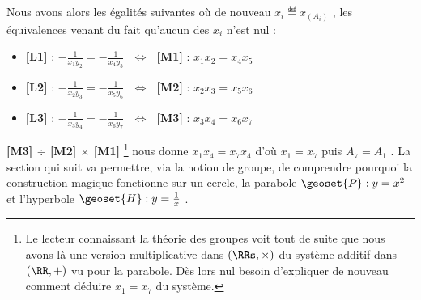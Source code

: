 \medskip

Nous avons alors les égalités suivantes où de nouveau $x_i \eqdef x_{(A_i)}$ , les équivalences venant du fait qu'aucun des $x_i$ n'est nul :
\begin{itemize}[label=\small\textbullet]
	\item \textbf{[L1]} : 
	      $- \frac{1}{x_1 y_2} = - \frac{1}{x_4 y_5}$
	      $\,\, \Longleftrightarrow \,\,$
	      \textbf{[M1]} : 
	      $x_1 x_{2} = x_{4} x_{5}$

	\item \textbf{[L2]} : 
	      $- \frac{1}{x_2 y_3} = - \frac{1}{x_5 y_6}$
	      $\,\, \Longleftrightarrow \,\,$
	      \textbf{[M2]} : 
	      $x_2 x_{3} = x_{5} x_{6}$

	\item \textbf{[L3]} : 
	      $- \frac{1}{x_3 y_4} = - \frac{1}{x_6 y_7}$
	      $\,\, \Longleftrightarrow \,\,$
	      \textbf{[M3]} : 
	      $x_3 x_{4} = x_{6} x_{7}$
\end{itemize}


\medskip

\textbf{[M3] $\div$ [M2] $\times$ [M1]}
\footnote{
	Le lecteur connaissant la théorie des groupes voit tout de suite que nous avons là une version multiplicative dans $(\RRs , \times)$ du système additif dans $(\RR , +)$ vu pour la parabole.
	Dès lors nul besoin d'expliquer de nouveau comment déduire  $x_1 = x_7$ du système.
}
nous donne $x_1 x_4 = x_7 x_4$ d'où $x_1 = x_7$ puis $A_7 = A_1$ .
La section qui suit va permettre, via la notion de groupe, de comprendre pourquoi la construction magique fonctionne sur un cercle, la parabole $\geoset{P} : y = x^2$ et l'hyperbole $\geoset{H} : y = \frac{1}{x}$ .
